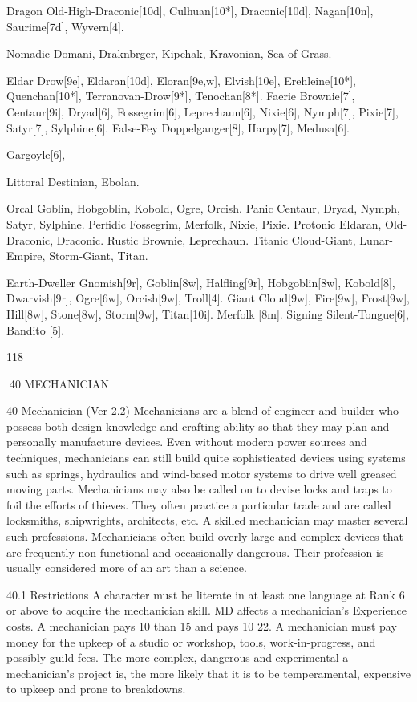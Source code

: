 \documentclass[a4paper]{article}
\begin{document}
\begin{multicols}{3}
Dragon Old-High-Draconic[10d], Culhuan[10*],
Draconic[10d], Nagan[10n], Saurime[7d], Wyvern[4].

Nomadic Domani, Draknbrger, Kipchak, Kravonian, Sea-of-Grass.

Eldar Drow[9e], Eldaran[10d], Eloran[9e,w],
Elvish[10e], Erehleine[10*], Quenchan[10*], Terranovan-Drow[9*], Tenochan[8*].
Faerie Brownie[7], Centaur[9i], Dryad[6],
Fossegrim[6], Leprechaun[6], Nixie[6], Nymph[7],
Pixie[7], Satyr[7], Sylphine[6].
False-Fey
Doppelganger[8],
Harpy[7], Medusa[6].

Gargoyle[6],

Littoral Destinian, Ebolan.

Orcal Goblin, Hobgoblin, Kobold, Ogre, Orcish.
Panic Centaur, Dryad, Nymph, Satyr, Sylphine.
Perfidic Fossegrim, Merfolk, Nixie, Pixie.
Protonic Eldaran, Old-Draconic, Draconic.
Rustic Brownie, Leprechaun.
Titanic Cloud-Giant, Lunar-Empire, Storm-Giant,
Titan.

Earth-Dweller
Gnomish[9r],
Goblin[8w],
Halfling[9r], Hobgoblin[8w], Kobold[8], Dwarvish[9r], Ogre[6w], Orcish[9w], Troll[4].
Giant Cloud[9w], Fire[9w], Frost[9w], Hill[8w],
Stone[8w], Storm[9w], Titan[10i].
Merfolk [8m].
Signing Silent-Tongue[6], Bandito [5].

118

40 MECHANICIAN

40 Mechanician (Ver 2.2)
Mechanicians are a blend of engineer and builder
who possess both design knowledge and crafting
ability so that they may plan and personally manufacture devices. Even without modern power
sources and techniques, mechanicians can still
build quite sophisticated devices using systems
such as springs, hydraulics and wind-based motor
systems to drive well greased moving parts.
Mechanicians may also be called on to devise locks
and traps to foil the efforts of thieves. They often
practice a particular trade and are called locksmiths, shipwrights, architects, etc. A skilled
mechanician may master several such professions.
Mechanicians often build overly large and complex
devices that are frequently non-functional and
occasionally dangerous. Their profession is usually
considered more of an art than a science.

40.1 Restrictions
A character must be literate in at least one language at Rank 6 or above to acquire the mechanician skill.
MD affects a mechanician’s Experience costs. A
mechanician pays 10%
than 15 and pays 10%
22.
A mechanician must pay money for the upkeep of
a studio or workshop, tools, work-in-progress, and
possibly guild fees.
The more complex, dangerous and experimental a
mechanician’s project is, the more likely that it is
to be temperamental, expensive to upkeep and
prone to breakdowns.


\end{multicols}
\end{document}
